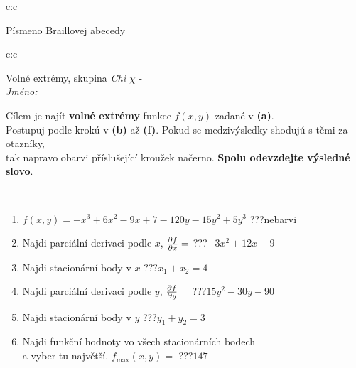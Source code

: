 \documentclass[10pt]{report}
\begin{document}
\begin{tabular}{c:c}
\begin{minipage}[c][104.5mm][t]{0.5\linewidth}
\begin{center}
\begin{minipage}{0.20\linewidth}
\begin{center}
{\small Písmeno Braillovej abecedy}
\end{center}
\end{minipage}
\end{center}
\end{minipage}
%
\end{tabular}
\newpage
\thispagestyle{empty}
\begin{tabular}{c:c}
\begin{minipage}[c][104.5mm][t]{0.5\linewidth}
\begin{center}
\vspace{7mm}
{\huge Volné extrémy, skupina \textit{Chi $\chi$} -}\\[5mm]
\textit{Jméno:}\phantom{xxxxxxxxxxxxxxxxxxxxxxxxxxxxxxxxxxxxxxxxxxxxxxxxxxxxxxxxxxxxxxxxx}\\[5mm]
\begin{minipage}{0.95\linewidth}
\begin{center}
Cílem je najít \textbf{volné extrémy} funkce $f(x,y)$ zadané v \textbf{(a)}.\\Postupuj podle krokú v \textbf{(b)} až \textbf{(f)}. Pokud se medzivýsledky shodujú s těmi za otazníky,\\tak napravo obarvi příslušející kroužek načerno. \textbf{Spolu odevzdejte výsledné slovo}.
\end{center}
\end{minipage}
\\[1mm]
\begin{minipage}{0.79\linewidth}
\begin{center}
\begin{varwidth}{\linewidth}
\begin{enumerate}
\normalsize
\item $f(x,y)=-x^3+6x^2-9x+7-120y-15y^2+5y^3$\quad \dotfill\; ???\;\dotfill \quad nebarvi
\item Najdi parciální derivaci podle $x$, $\pdv{f}{x}=$\quad \dotfill\; ???\;\dotfill \quad $-3x^2+12x-9$
\item Najdi stacionární body v $x$\quad \dotfill\; ???\;\dotfill \quad $x_1+x_2=4$
\item Najdi parciální derivaci podle $y$, $\pdv{f}{y}=$\quad \dotfill\; ???\;\dotfill \quad $15y^2-30y-90$
\item Najdi stacionární body v $y$\quad \dotfill\; ???\;\dotfill \quad $y_1+y_2=3$
\item Najdi funkční hodnoty vo všech stacionárních bodech \\ \phantom{xxxxxx} a vyber tu najvětší. $f_{\text{max}}(x,y)=$\quad \dotfill\; ???\;\dotfill \quad $147$

\end{enumerate}
\end{varwidth}
\end{center}
\end{minipage}
\end{center}
\end{minipage}
\end{tabular}
\end{document}
